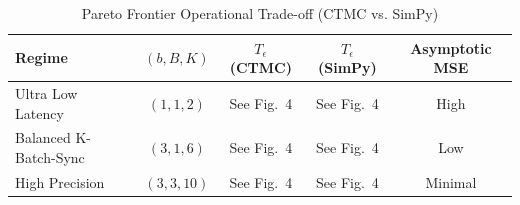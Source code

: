 \begin{table}[t]
\centering
\caption{Pareto Frontier Operational Trade-off (CTMC vs. SimPy)}
\label{tab:pareto_summary}
\begin{tabular}{lcccc}
\toprule
\textbf{Regime} & \textbf{$(b, B, K)$} & \textbf{$T_\epsilon$ (CTMC)} & \textbf{$T_\epsilon$ (SimPy)} & \textbf{Asymptotic MSE} \\
\midrule
Ultra Low Latency & $(1,1,2)$ & See Fig.~4 & See Fig.~4 & High \\
Balanced K-Batch-Sync & $(3,1,6)$ & See Fig.~4 & See Fig.~4 & Low \\
High Precision & $(3,3,10)$ & See Fig.~4 & See Fig.~4 & Minimal \\
\bottomrule
\end{tabular}
\end{table}

